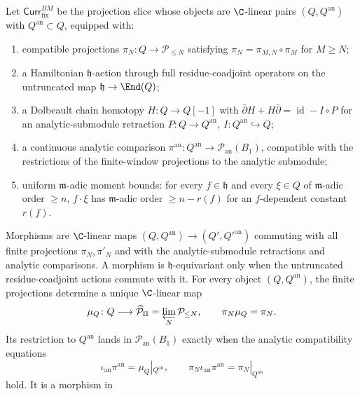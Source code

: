 \begin{thm}\label{thm:promatlis-universal-property}
  Let \(\mathsf{Curr}^{BM}_{\mathrm{fix}}\) be the projection slice whose
  objects are
  \(\C\)-linear pairs
  \((Q,Q^{\mathrm{an}})\) with \(Q^{\mathrm{an}}\subset Q\), equipped
  with:
  \begin{enumerate}[label=(\alph*)]
    \item compatible projections \(\pi_N\colon Q\to\mathcal P_{\le N}\)
      satisfying \(\pi_N=\pi_{M,N}\circ\pi_M\) for \(M\ge N\);
    \item a Hamiltonian \(\mathfrak h\)-action through full residue-coadjoint
      operators on the untruncated map \(\mathfrak h\to\End(Q)\);
    \item a Dolbeault chain homotopy
      \(H\colon Q\to Q[-1]\) with \(\bar\partial H+H\bar\partial
       =\operatorname{id}-I\circ P\) for an analytic-submodule
      retraction
      \(P\colon Q\to Q^{\mathrm{an}},\ I\colon Q^{\mathrm{an}}
       \hookrightarrow Q\);
    \item a continuous analytic comparison
      \(\pi^{\mathrm{an}}\colon Q^{\mathrm{an}}\to
      \mathcal P_{\mathrm{an}}(B_1)\), compatible with the restrictions of
      the finite-window projections to the analytic submodule;
    \item uniform \(\mathfrak m\)-adic moment bounds: for every
      \(f\in\mathfrak h\) and every \(\xi\in Q\) of \(\mathfrak m\)-adic
      order \(\ge n\), \(f\cdot\xi\) has \(\mathfrak m\)-adic order
      \(\ge n-r(f)\) for an \(f\)-dependent constant \(r(f)\).
  \end{enumerate}
  Morphisms are \(\C\)-linear maps
  \((Q,Q^{\mathrm{an}})\to(Q',Q'^{\mathrm{an}})\) commuting with all
  finite projections \(\pi_N,\pi'_N\) and with the analytic-submodule
  retractions and analytic comparisons.  A morphism is
  \(\mathfrak h\)-equivariant only when the untruncated
  residue-coadjoint actions commute with it.  For every object
  \((Q,Q^{\mathrm{an}})\), the finite projections determine a unique
  \(\C\)-linear map
  \[
    \mu_Q\colon Q\longrightarrow
    \widehat{\mathcal P}_\Pi=\varprojlim_N\mathcal P_{\le N},
    \qquad
    \pi_N\mu_Q=\pi_N .
  \]
  Its restriction to \(Q^{\mathrm{an}}\) lands in
  \(\mathcal P_{\mathrm{an}}(B_1)\) exactly when the analytic
  compatibility equations
  \[
    \iota_{\mathrm{an}}\pi^{\mathrm{an}}=\mu_Q|_{Q^{\mathrm{an}}},
    \qquad
    \pi_N\iota_{\mathrm{an}}\pi^{\mathrm{an}}=\pi_N|_{Q^{\mathrm{an}}}
  \]
  hold.  It is a morphism in

\end{thm}
